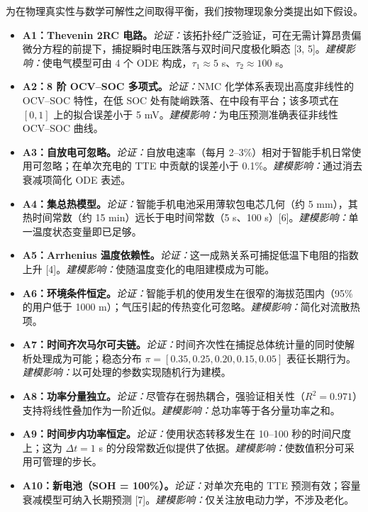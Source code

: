 \documentclass[11pt,a4paper]{ctexart}
\begin{document}
为在物理真实性与数学可解性之间取得平衡，我们按物理现象分类提出如下假设。

\begin{itemize}[leftmargin=1.6em,itemsep=0.45em]
\item \textbf{A1：Thevenin 2RC 电路。}\emph{论证：}该拓扑经广泛验证，可在无需计算昂贵偏微分方程的前提下，捕捉瞬时电压跌落与双时间尺度极化瞬态 [3, 5]。\emph{建模影响：}使电气模型可由 4 个 ODE 构成，$\tau_1 \approx 5$ s、$\tau_2 \approx 100$ s。

\item \textbf{A2：8 阶 OCV--SOC 多项式。}\emph{论证：}NMC 化学体系表现出高度非线性的 OCV--SOC 特性，在低 SOC 处有陡峭跌落、在中段有平台；该多项式在 $[0,1]$ 上的拟合误差小于 5 mV。\emph{建模影响：}为电压预测准确表征非线性 OCV--SOC 曲线。

\item \textbf{A3：自放电可忽略。}\emph{论证：}自放电速率（每月 2--3\%）相对于智能手机日常使用可忽略；在单次充电的 TTE 中贡献的误差小于 0.1\%。\emph{建模影响：}通过消去衰减项简化 ODE 表述。

\item \textbf{A4：集总热模型。}\emph{论证：}智能手机电池采用薄软包电芯几何（约 5 mm），其热时间常数（约 15 min）远长于电时间常数（5 s、100 s）[6]。\emph{建模影响：}单一温度状态变量即已足够。

\item \textbf{A5：Arrhenius 温度依赖性。}\emph{论证：}这一成熟关系可捕捉低温下电阻的指数上升 [4]。\emph{建模影响：}使随温度变化的电阻建模成为可能。

\item \textbf{A6：环境条件恒定。}\emph{论证：}智能手机的使用发生在很窄的海拔范围内（95\% 的用户低于 1000 m）；气压引起的传热变化可忽略。\emph{建模影响：}简化对流散热项。

\item \textbf{A7：时间齐次马尔可夫链。}\emph{论证：}时间齐次性在捕捉总体统计量的同时使解析处理成为可能；稳态分布 $\pi = [0.35, 0.25, 0.20, 0.15, 0.05]$ 表征长期行为。\emph{建模影响：}以可处理的参数实现随机行为建模。

\item \textbf{A8：功率分量独立。}\emph{论证：}尽管存在弱热耦合，强验证相关性（$R^2 = 0.971$）支持将线性叠加作为一阶近似。\emph{建模影响：}总功率等于各分量功率之和。

\item \textbf{A9：时间步内功率恒定。}\emph{论证：}使用状态转移发生在 10--100 秒的时间尺度上；这为 $\Delta t = 1$ s 的分段常数近似提供了依据。\emph{建模影响：}使数值积分可采用可管理的步长。

\item \textbf{A10：新电池（SOH = 100\%）。}\emph{论证：}对单次充电的 TTE 预测有效；容量衰减模型可纳入长期预测 [7]。\emph{建模影响：}仅关注放电动力学，不涉及老化。
\end{itemize}
\end{document}
